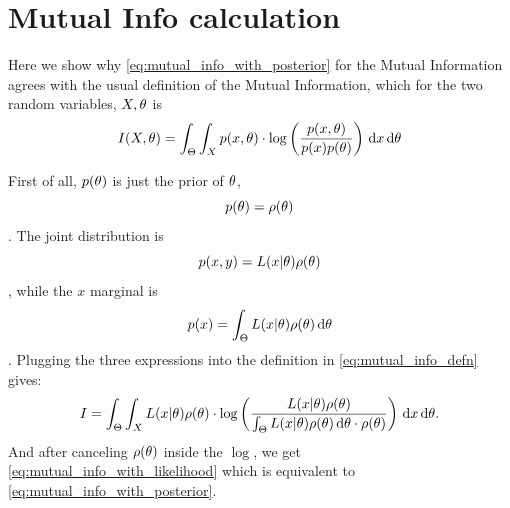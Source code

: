 \documentclass{article}
\begin{document}
\clearpage \appendix
\section{Mutual Info calculation}
\label{sec:mutual_info_defn} 
Here we show why \cref{eq:mutual_info_with_posterior} for
the Mutual Information agrees with the usual definition of the Mutual Information, which
for the two random variables, $X,{\theta}$ is
\begin{equation}
I(X,{\theta}) = \int_\Theta \int_X p(x,{\theta}) \cdot \log \left(
\frac{p(x,{\theta})}{p(x)p({\theta})}\right) \, \mathrm{d} x \, \mathrm{d} {\theta}
\label{eq:mutual_info_defn}
\end{equation}

First of all, $p({\theta})$  is just the prior of ${\theta}$, $$p({\theta}) = \rho({\theta})$$.
The joint distribution is $$p(x,y) = L(x|{\theta})\rho({\theta})$$, while the $x$
marginal is $$p(x) = \int_\Theta L(x|{\theta})\rho({\theta}) \, \mathrm{d} {\theta}$$.
Plugging the three expressions into the definition in
\cref{eq:mutual_info_defn} gives:
\begin{equation}
I = \int_\Theta \int_X L(x|{\theta})\rho({\theta}) \cdot 
\log \left( \frac{L(x|{\theta})\rho({\theta}) }{\int_\Theta L(x|{\theta})\rho({\theta}) \, \mathrm{d} {\theta}
\cdot \rho({\theta}) } \right)
\, \mathrm{d} x\, \mathrm{d} {\theta}.
\label{eq:mutual_info_prior_trajectory}
\end{equation}
And after canceling $\rho({\theta})$ inside the $\log$, we get
\cref{eq:mutual_info_with_likelihood} which is equivalent to
\cref{eq:mutual_info_with_posterior}.




 

\end{document}
